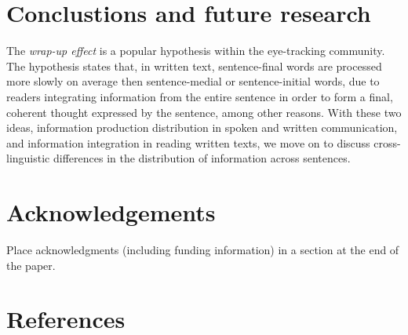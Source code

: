 \documentclass[10pt, letterpaper]{article}
\begin{document}
\section{Conclustions and future
research}\label{conclustions-and-future-research}

The \emph{wrap-up effect} is a popular hypothesis within the
eye-tracking community. The hypothesis states that, in written text,
sentence-final words are processed more slowly on average then
sentence-medial or sentence-initial words, due to readers integrating
information from the entire sentence in order to form a final, coherent
thought expressed by the sentence, among other reasons. With these two
ideas, information production distribution in spoken and written
communication, and information integration in reading written texts, we
move on to discuss cross-linguistic differences in the distribution of
information across sentences.

\section{Acknowledgements}\label{acknowledgements}

Place acknowledgments (including funding information) in a section at
the end of the paper.

\section{References}\label{references}

\setlength{\parindent}{-0.1in} \setlength{\leftskip}{0.125in} \noindent


\end{document}
